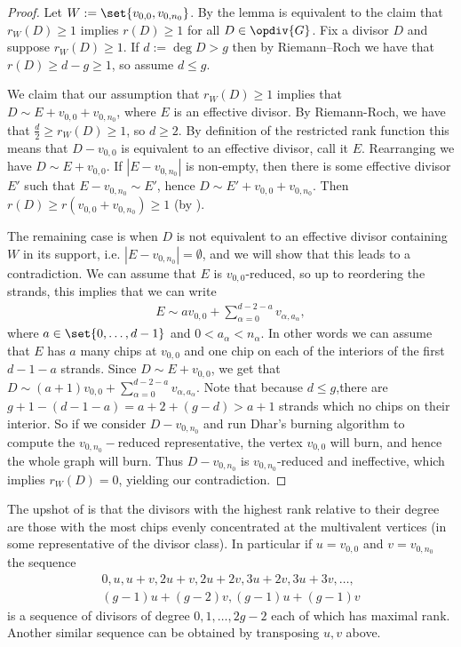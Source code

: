 \begin{proof}
    Let $W:=\set{v_{0,0},v_{0,n_0}}$. By \cite[Proposition 3.1]{RDS} the lemma is equivalent to the claim that $r_W(D) \geq 1$ implies $r(D)\geq 1$ for all $D \in \opdiv{G}$. Fix a divisor $D$ and suppose $r_W(D) \geq 1$. If $d:=\deg D >g$ then by Riemann--Roch we have that $r(D) \geq d-g \geq 1$, so assume $d\leq g$. 
    
    We claim that our assumption that $r_W(D)\geq 1$ implies that $D \sim E + v_{0,0} + v_{0,n_0}$, where $E$ is an effective divisor. By Riemann-Roch, we have that $\frac{d}{2} \geq r_W(D) \geq 1$, so $d\geq 2$. By definition of the restricted rank function this means that $D-v_{0,0}$ is equivalent to an effective divisor, call it $E$. Rearranging we have $D \sim E + v_{0,0}$. If $|E-v_{0,n_0}|$ is non-empty, then there is some effective divisor $E'$ such that $E-v_{0,n_0} \sim E'$, hence $D \sim E' + v_{0,0}+v_{0,n_0}$. Then $r(D)\geq r(v_{0,0} + v_{0,n_0}) \geq 1$ (by ). 
    
    The remaining case is when $D$ is not equivalent to an effective divisor containing $W$ in its support, i.e. $|E-v_{0,n_0}| = \emptyset$, and we will show that this leads to a contradiction. We can assume that $E$ is $v_{0,0}$-reduced, so up to reordering the strands, this implies that we can write
    \begin{align*}
        E \sim av_{0,0} + \sum_{\alpha = 0}^{d-2-a}v_{\alpha,a_\alpha},
    \end{align*}
    where $a \in \set{0,\dots,d-1}$ and $0<a_\alpha<n_\alpha$. In other words we can assume that $E$ has $a$ many chips at $v_{0,0}$ and one chip on each of the interiors of the first $d-1-a$ strands. Since $D \sim E+v_{0,0}$, we get that $D \sim (a+1)v_{0,0} + \sum_{\alpha = 0}^{d-2-a}v_{\alpha,a_\alpha}$. Note that because $d\leq g$,there are $g+1-(d-1-a) = a+2 + (g-d) > a+1$ strands which no chips on their interior. So if we consider $D-v_{0,n_0}$ and run Dhar's burning algorithm to compute the $v_{0,n_0}-$reduced representative, the vertex $v_{0,0}$ will burn, and hence the whole graph will burn. Thus $D- v_{0,n_0}$ is $v_{0,n_0}$-reduced and ineffective, which implies $r_{W}(D)  = 0$, yielding our contradiction.
\end{proof}

\begin{rema}
    The upshot of  is that the divisors with the highest rank relative to their degree are those with the most chips evenly concentrated at the multivalent vertices (in some representative of the divisor class). In particular if $u = v_{0,0}$ and $v = v_{0,n_0}$ the sequence
    \begin{align*}
        0,u,u+v,2u+v,2u+2v,3u+2v,3u+3v,\dots,\\(g-1)u+(g-2)v,(g-1)u+(g-1)v
    \end{align*}
    is a sequence of divisors of degree $0,1,\dots, 2g-2$ each of which has maximal rank. Another similar sequence can be obtained by transposing $u,v$ above.
\end{rema}

